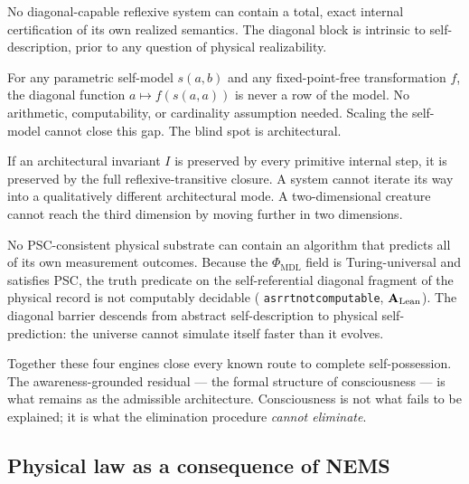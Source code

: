 \documentclass[11pt]{article}
\theoremstyle{remark}
\newcommand{\PHIMDL}{\Phi_{\mathrm{MDL}}}
\newcommand{\lean}[1]{%
  \penalty-100
  \begingroup\def\_{\textunderscore\allowbreak}\texttt{#1}\endgroup}
\newcommand{\CatAL}{\ensuremath{\textbf{A}_{\rm Lean}}}
\begin{document}
\medskip
\begin{termlist}
  \item[Engine~1 --- Semantic incompleteness]
    No diagonal-capable reflexive system can contain a total, exact internal
    certification of its own realized semantics. The diagonal block is intrinsic
    to self-description, prior to any question of physical realizability.

  \item[Engine~2 --- Representational incompleteness~\cite{SpivackRepIncomp}]
    For any parametric self-model $s(a,b)$ and any fixed-point-free transformation $f$,
    the diagonal function $a \mapsto f(s(a,a))$ is never a row of the model.
    No arithmetic, computability, or cardinality assumption needed. Scaling the
    self-model cannot close this gap. The blind spot is architectural.

  \item[Engine~3 --- Fold obstruction~\cite{SpivackRFO}]
    If an architectural invariant $I$ is preserved by every primitive internal step,
    it is preserved by the full reflexive-transitive closure. A system cannot iterate
    its way into a qualitatively different architectural mode. A two-dimensional
    creature cannot reach the third dimension by moving further in two dimensions.

  \item[Engine~4 --- Physical incompleteness~\cite{SpivackNEMS11}]
    No PSC-consistent physical substrate can contain an algorithm that predicts all
    of its own measurement outcomes. Because the $\PHIMDL$ field is Turing-universal
    and satisfies PSC, the truth predicate on the self-referential diagonal fragment
    of the physical record is not computably decidable
    (\lean{asr\_rt\_not\_computable}, \CatAL). The diagonal barrier descends from
    abstract self-description to physical self-prediction: the universe cannot
    simulate itself faster than it evolves.
\end{termlist}

\medskip
Together these four engines close every known route to complete self-possession.
The awareness-grounded residual --- the formal structure of consciousness --- is what
remains as the admissible architecture. Consciousness is not what fails to be
explained; it is what the elimination procedure \emph{cannot eliminate}.

\subsection{Physical law as a consequence of NEMS}
\end{document}
